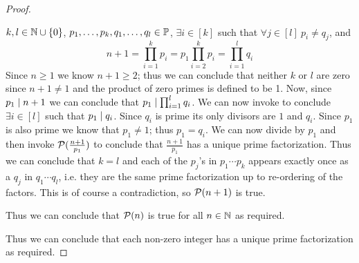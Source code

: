 \begin{proof}
\begin{enumerate}
\begin{itemize}
                            $k, l \in \mathbb{N} \cup \left\{0\right\}$, $p_1, \dots, p_k, q_1, \dots, q_l \in \mathbb{P}$,
                            $\exists i \in [k]$ such that $\forall j \in [l] \ p_i \neq q_j$, and
                            \begin{equation}
                                n + 1 = \prod_{i = 1}^{k} p_i = p_1 \prod_{i = 2}^{k} p_i = \prod_{i = 1}^{l} q_i
                                \label{FTA equation 1}
                            \end{equation}
                            Since $n \ge 1$ we know $n + 1 \ge 2$; thus we can conclude that neither
                            $k$ or $l$ are zero since $n + 1 \neq 1$ and the product of zero primes
                            is defined to be 1. Now, since $p_1 \mid n + 1$ we can conclude
                            that $p_1 \mid \prod_{i = 1}^{l} q_i$. We can now invoke
                             to conclude $\exists i \in [l]$ such that $p_1 \mid q_i$.
                            Since $q_i$ is prime its only divisors are $1$ and $q_i$. Since $p_1$
                            is also prime we know that $p_1 \neq 1$; thus $p_1 = q_i$.
                            We can now divide  by $p_1$ and then
                            invoke $\mathcal{P}(\frac{n + 1}{p_1})$ to conclude that $\frac{n + 1}{p_1}$
                            has a unique prime factorization. Thus
                            we can conclude that $k = l$ and each of the $p_j$'s in
                            $p_1 \cdots p_k$ appears exactly once as a $q_j$ in $q_1 \cdots q_l$,
                            i.e. they are the same prime factorization up to re-ordering of the factors.
                            This is of course a contradiction, so $\mathcal{P}(n + 1)$ is true.
                    \end{itemize}
                    Thus we can conclude that $\mathcal{P}(n)$ is true for all $n \in \mathbb{N}$
                    as required.
            \end{enumerate}
            Thus we can conclude that each non-zero integer has a unique prime
            factorization as required. \QED
        \end{proof}
